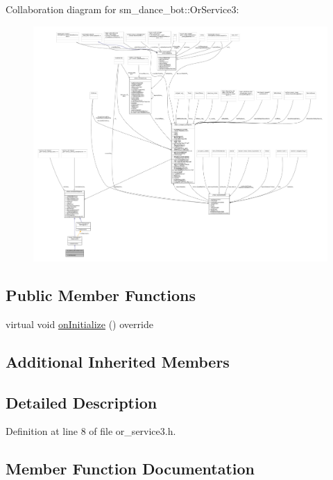 Collaboration diagram for sm\+\_\+dance\+\_\+bot\+:\+:Or\+Service3\+:
\nopagebreak
\begin{figure}[H]
\begin{center}
\leavevmode
\includegraphics[width=350pt]{classsm__dance__bot_1_1OrService3__coll__graph}
\end{center}
\end{figure}
\subsection*{Public Member Functions}
\begin{DoxyCompactItemize}
\item 
virtual void \hyperlink{classsm__dance__bot_1_1OrService3_a394d93c4a340257b8b1b941adeed8cd9}{on\+Initialize} () override
\end{DoxyCompactItemize}
\subsection*{Additional Inherited Members}


\subsection{Detailed Description}


Definition at line 8 of file or\+\_\+service3.\+h.



\subsection{Member Function Documentation}
\mbox{\label{classsm__dance__bot_1_1OrService3_a394d93c4a340257b8b1b941adeed8cd9}} 
